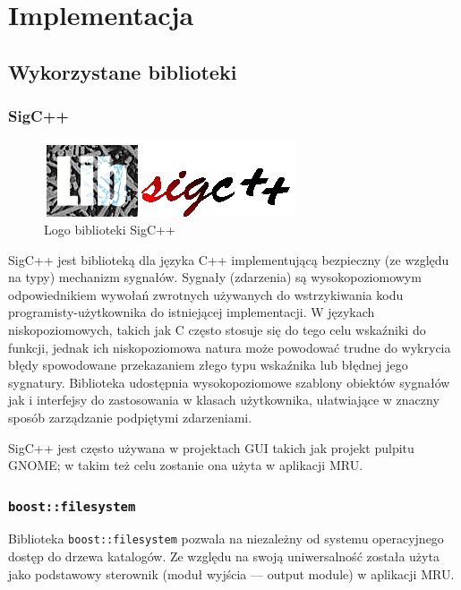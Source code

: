 \chapter{Implementacja}

\clearpage
\section{Wykorzystane biblioteki}
\subsection{SigC++}
\begin{figure}
\begin{center}
\includegraphics[scale=0.50]{img/sigcpp_logo.png}
\end{center}
\caption{Logo biblioteki SigC++}
\end{figure}
\par
SigC++ jest biblioteką dla języka C++ implementującą bezpieczny (ze względu na typy) mechanizm sygnałów.
Sygnały (zdarzenia) są wysokopoziomowym odpowiednikiem wywołań zwrotnych używanych do wstrzykiwania kodu programisty-użytkownika do istniejącej implementacji. W językach niskopoziomowych, takich jak C często stosuje się do tego celu wskaźniki do funkcji, jednak ich niskopoziomowa natura może powodować trudne do wykrycia błędy spowodowane przekazaniem złego typu wskaźnika lub błędnej jego sygnatury. Biblioteka udostępnia wysokopoziomowe szablony obiektów sygnałów jak i interfejsy do zastosowania w klasach użytkownika, ułatwiające w znaczny sposób zarządzanie podpiętymi zdarzeniami.\\
\par
SigC++ jest często używana w projektach GUI takich jak projekt pulpitu GNOME; w takim też celu zostanie ona użyta w aplikacji MRU.

\subsection{\texttt{boost::filesystem}}
\par
Biblioteka \texttt{boost::filesystem} pozwala na niezależny od systemu operacyjnego dostęp do drzewa katalogów. Ze względu na swoją uniwersalność została użyta jako podstawowy sterownik (moduł wyjścia --- output module) w aplikacji MRU.

